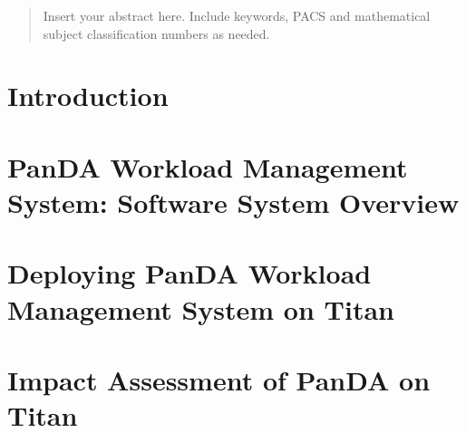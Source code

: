 \documentclass[smallextended]{svjour3}      %
\begin{document}
\begin{abstract}
Insert your abstract here. Include keywords, PACS and mathematical
subject classification numbers as needed.
\end{abstract}



\section{Introduction}
\label{sec:introduction}



\section{PanDA Workload Management System: Software System Overview}
\label{sec:overview}



\section{Deploying PanDA Workload Management System on Titan}
\label{sec:deploying}



\section{Impact Assessment of PanDA on Titan}
\label{sec:impact-assessment}
\end{document}
